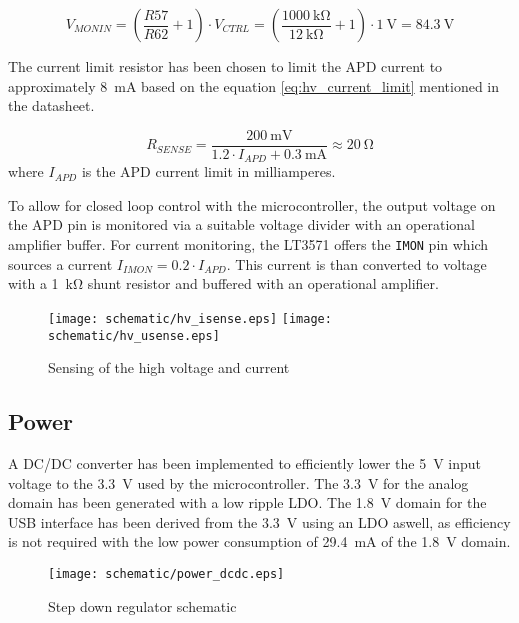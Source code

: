 \begin{equation}
V_{MONIN} = (\frac{R57}{R62} + 1) \cdot V_{CTRL} = (\frac{\SI{1000}{\kilo\ohm}}{\SI{12}{\kilo\ohm}} + 1) \cdot \SI{1}{\volt} = \SI{84.3}{\volt}
\label{eq:hv_voltage_fb}
\end{equation}


The current limit resistor has been chosen to limit the APD current to approximately \SI{8}{\milli\ampere} based on the equation \ref{eq:hv_current_limit} mentioned in the datasheet.

\begin{equation}
R_{SENSE} = \frac{\SI{200}{\milli\volt}}{1.2 \cdot I_{APD} + \SI{0.3}{\milli\ampere}} \approx \SI{20}{\ohm}
\label{eq:hv_current_limit}
\end{equation}
%
where $I_{APD}$ is the APD current limit in milliamperes.

To allow for closed loop control with the microcontroller, the output voltage on the APD pin is monitored via a suitable voltage divider with an operational amplifier buffer. For current monitoring, the LT3571 offers the \verb|IMON| pin which sources a current $I_{IMON} = 0.2 \cdot I_{APD}$. This current is than converted to voltage with a \SI{1}{\kilo\ohm} shunt resistor and buffered with an operational amplifier.

\FloatBarrier
\begin{figure}[htp!]
    \centering
    \texttt{[image: schematic/hv\_isense.eps]}
    \texttt{[image: schematic/hv\_usense.eps]}
    \caption{Sensing of the high voltage and current}
    \label{fig:schem_hvsense}
\end{figure}
\FloatBarrier

\subsection{Power}
A DC/DC converter has been implemented to efficiently lower the \SI{5}{\volt} input voltage to the \SI{3.3}{\volt} used by the microcontroller. The \SI{3.3}{\volt} for the analog domain has been generated with a low ripple LDO. The \SI{1.8}{\volt} domain for the USB interface has been derived from the \SI{3.3}{\volt} using an LDO aswell, as efficiency is not required with the low power consumption of \SI{29.4}{\milli\ampere} of the \SI{1.8}{\volt} domain.
\FloatBarrier
\begin{figure}[htp!]
    \centering
    \texttt{[image: schematic/power\_dcdc.eps]}
    \caption{Step down regulator schematic}
    \label{fig:schem_dcdc}
\end{figure}
\FloatBarrier

